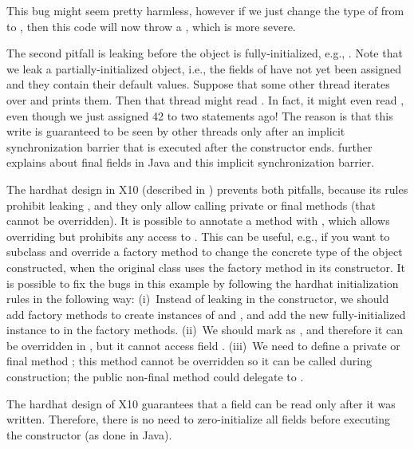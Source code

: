 This bug might seem pretty harmless,
    however if we just change the type of  from  to ,
    then this code will now throw a ,
    which is more severe.

The second pitfall is leaking \this before the object is fully-initialized,
    e.g., .
Note that we leak a partially-initialized object, i.e.,
    the fields of  have not yet been assigned and they contain their default values.
Suppose that some other thread iterates over  and prints them.
Then that thread might read .
In fact, it might even read , even though we just assigned 42 to  two statements ago!
The reason is that this write is guaranteed to be seen by other threads only
    after an implicit synchronization barrier that is executed after the constructor ends.
 further explains about final fields in Java and this implicit synchronization barrier.



The hardhat design in X10 (described in )
    prevents both pitfalls,
    because its rules prohibit leaking \this,
    and they only allow calling private or final methods (that cannot be overridden).
It is possible to annotate a method with ,
    which allows overriding but prohibits any access to \this.
This can be useful, e.g., if you want to subclass and override a factory method
    to change the concrete type of the object constructed,
    when the original class uses the factory method in its constructor.
It is possible to fix the bugs in this example by following the hardhat initialization rules
    in the following way:
    (i)~Instead of leaking \this in the constructor,
        we should add factory methods to create instances of  and ,
        and add the new fully-initialized instance to  in the factory methods.
    (ii)~We should mark  as ,
        and therefore it can be overridden in , but it cannot access field .
    (iii)~We need to define a private or final method ;
        this method cannot be overridden so it can be called during construction;
        the public non-final method  could delegate to .

The hardhat design of X10 guarantees that a field can be read only after it was written.
Therefore, there is no need to zero-initialize all fields before executing the constructor (as done in Java).



